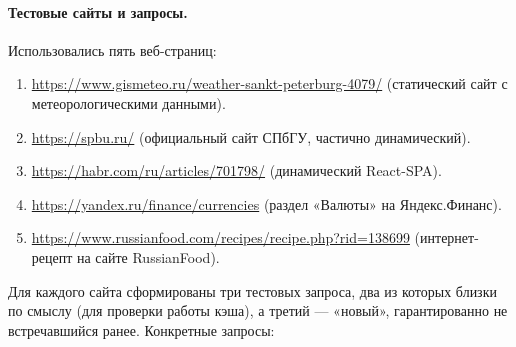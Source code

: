 \paragraph{Тестовые сайты и запросы.}
Использовались пять веб-страниц:
\begin{enumerate}
    \item \url{https://www.gismeteo.ru/weather-sankt-peterburg-4079/} (статический сайт с метеорологическими данными).
    \item \url{https://spbu.ru/} (официальный сайт СПбГУ, частично динамический).
    \item \url{https://habr.com/ru/articles/701798/} (динамический React-SPA).
    \item \url{https://yandex.ru/finance/currencies} (раздел «Валюты» на Яндекс.Финанс).
    \item \url{https://www.russianfood.com/recipes/recipe.php?rid=138699} (интернет-рецепт на сайте RussianFood).
\end{enumerate}
Для каждого сайта сформированы три тестовых запроса, два из которых близки по смыслу (для проверки работы кэша), а третий — «новый», гарантированно не встречавшийся ранее. Конкретные запросы:

